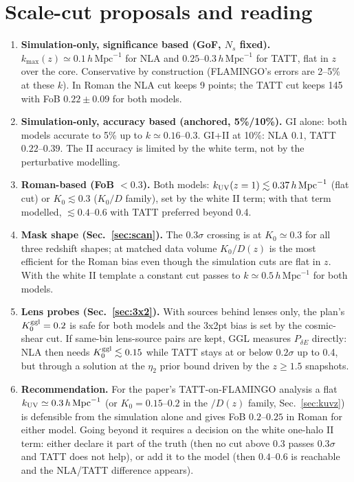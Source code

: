 \documentclass[11pt]{article}
\newcommand{\hmpc}{\,h\,\mathrm{Mpc}^{-1}}
\begin{document}
\section{Scale-cut proposals and reading}
\begin{enumerate}
\item \textbf{Simulation-only, significance based (GoF, $N_s$ fixed).} $k_{\max}(z)\simeq0.1\hmpc$ for NLA and $0.25$--$0.3\hmpc$ for TATT, flat in $z$ over the core. Conservative by construction (FLAMINGO's errors are 2--5\% at these $k$). In Roman the NLA cut keeps 9 points; the TATT cut keeps 145 with FoB $0.22\pm0.09$ for both models.
\item \textbf{Simulation-only, accuracy based (anchored, 5\%/10\%).} GI alone: both models accurate to 5\% up to $k\simeq0.16$--$0.3$. GI+II at 10\%: NLA $0.1$, TATT $0.22$--$0.39$. The II accuracy is limited by the white term, not by the perturbative modelling.
\item \textbf{Roman-based (FoB $<0.3$).} Both models: $k_{\rm UV}(z=1)\lesssim0.37\hmpc$ (flat cut) or $K_0\lesssim0.3$ ($K_0/D$ family), set by the white II term; with that term modelled, $\lesssim0.4$--$0.6$ with TATT preferred beyond 0.4.
\item \textbf{Mask shape (Sec.~\ref{sec:scan}).} The $0.3\sigma$ crossing is at $K_0\simeq0.3$ for all three redshift shapes; at matched data volume $K_0/D(z)$ is the most efficient for the Roman bias even though the simulation cuts are flat in $z$. With the white II template a constant cut passes to $k\simeq0.5\hmpc$ for both models.
\item \textbf{Lens probes (Sec.~\ref{sec:3x2}).} With sources behind lenses only, the plan's $K_0^{\rm ggl}=0.2$ is safe for both models and the 3x2pt bias is set by the cosmic-shear cut. If same-bin lens-source pairs are kept, GGL measures $P_{\delta E}$ directly: NLA then needs $K_0^{\rm ggl}\lesssim0.15$ while TATT stays at or below $0.2\sigma$ up to 0.4, but through a solution at the $\eta_2$ prior bound driven by the $z\ge1.5$ snapshots.
\item \textbf{Recommendation.} For the paper's TATT-on-FLAMINGO analysis a flat $k_{\rm UV}\simeq0.3\hmpc$ (or $K_0=0.15$--$0.2$ in the $/D(z)$ family, Sec.~\ref{sec:kuvz}) is defensible from the simulation alone and gives FoB $0.2$--$0.25$ in Roman for either model. Going beyond it requires a decision on the white one-halo II term: either declare it part of the truth (then no cut above $0.3$ passes $0.3\sigma$ and TATT does not help), or add it to the model (then $0.4$--$0.6$ is reachable and the NLA/TATT difference appears).
\end{enumerate}
\end{document}
